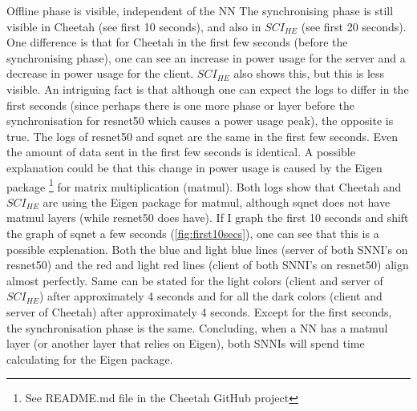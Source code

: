 \documentclass[../thesis.tex]{subfiles}
\begin{document}
\color{red}Offline phase is visible, independent of the NN\color{black}
The synchronising phase is still visible in Cheetah (see first 10 seconds), and also in $SCI_{HE}$ (see first 20 seconds). One difference is that for Cheetah in the first few seconds (before the synchronising phase), one can see an increase in power usage for the server and a decrease in power usage for the client. $SCI_{HE}$ also shows this, but this is less visible. An intriguing fact is that although one can expect the logs to differ in the first seconds (since perhaps there is one more phase or layer before the synchronisation for resnet50 which causes a power usage peak), the opposite is true. The logs of resnet50 and sqnet are the same in the first few seconds. Even the amount of data sent in the first few seconds is identical. A possible explanation could be that this change in power usage is caused by the Eigen package \footnote{See README.md file in the Cheetah GitHub project} for matrix multiplication (matmul). Both logs show that Cheetah and $SCI_{HE}$ are using the Eigen package for matmul, although sqnet does not have matmul layers (while resnet50 does have). If I graph the first 10 seconds and shift the graph of sqnet a few seconds (\autoref{fig:first10secs}), one can see that this is a possible explenation. Both the blue and light blue lines (server of both SNNI's on resnet50) and the red and light red lines (client of both SNNI's on resnet50) align almost perfectly. Same can be stated for the light colors (client and server of $SCI_{HE}$) after approximately 4 seconds and for all the dark colors (client and server of Cheetah) after approximately 4 seconds. Except for the first seconds, the synchronisation phase is the same. Concluding, when a NN has a matmul layer (or another layer that relies on Eigen), both SNNIs will spend time calculating for the Eigen package.
\end{document}

